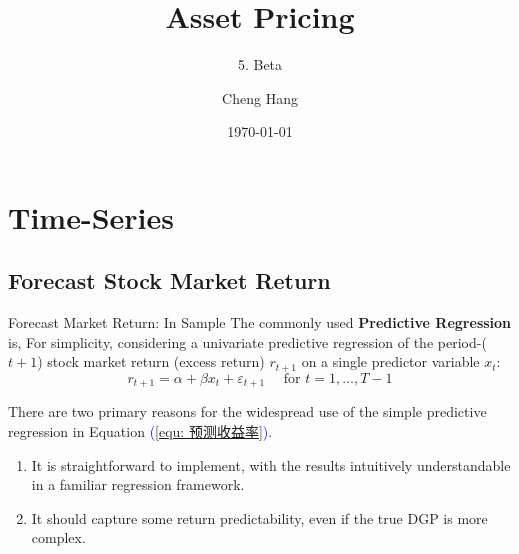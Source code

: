 \documentclass{beamer}
\title[Asset Pricing]{\textbf{Asset Pricing}} %
\subtitle{5. Beta}
\author[Cheng Hang]{Cheng Hang} %
\institute[DUFE] %
{School of Fintech \\
Dongbei University of Finance \& Economics \\ %
\medskip
\textbf{chenghangch@qq.com}%
}
\date{\today} %
\begin{document}
\begin{frame}
\titlepage %
\end{frame}



\section{Time-Series}
\subsection{Forecast Stock Market Return}

\begin{frame}{Forecast Market Return: In Sample}
The commonly used \textbf{Predictive Regression} is, For simplicity, considering a univariate predictive regression of the period-($t + 1$) stock market return (excess return) $r_{t+1}$ on a single predictor variable $x_t$:
\begin{equation}\label{equ: 预测收益率}
	r_{t+1}=\alpha+\beta x_t+\varepsilon_{t+1} \quad \text { for } t=1, \ldots, T-1
\end{equation}

There are two primary reasons for the widespread use of the simple predictive regression in Equation \textcolor{blue}{(\ref{equ: 预测收益率})}.
\begin{enumerate}
	\item It is straightforward to implement, with the results intuitively understandable in a familiar regression framework.
	\item It should capture some return predictability, even if the true DGP is more complex.
\end{enumerate}
\end{frame}
\end{document}
